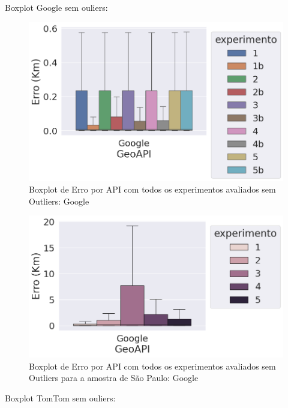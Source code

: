 Boxplot Google sem ouliers:

\begin{figure}[h]
    \centering
    \includegraphics[width=\textwidth]{Figuras/boxplotApiGoogleSemOut.png}
    \caption{Boxplot de Erro por API com todos os experimentos avaliados sem Outliers: Google}
    \label{fig:boxplot-api-google-semout}
\end{figure}


\begin{figure}[h]
  \centering
  \includegraphics[width=\textwidth]{Figuras/boxplotApiGoogleSemOutsp.png}
  \caption{Boxplot de Erro por API com todos os experimentos avaliados sem Outliers para a amostra de São Paulo: Google}
  \label{fig:boxplot-api-google-semout-sp}
\end{figure}


Boxplot TomTom sem ouliers:

